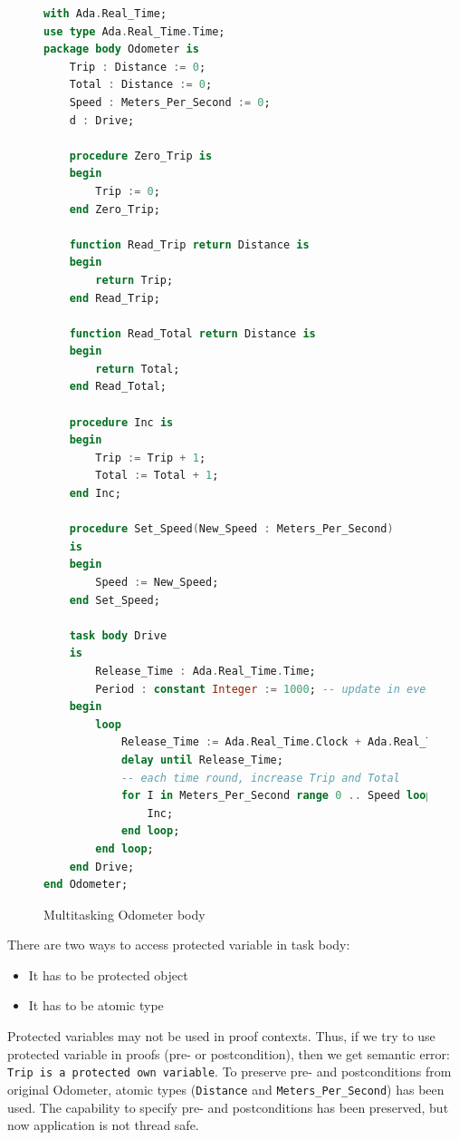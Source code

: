 \begin{figure}
\singlespacing
\begin{lstlisting}[language=ada, frame=single, gobble=0]
with Ada.Real_Time;
use type Ada.Real_Time.Time;
package body Odometer is
    Trip : Distance := 0;
    Total : Distance := 0;
    Speed : Meters_Per_Second := 0;
    d : Drive;
    
    procedure Zero_Trip is
    begin
        Trip := 0;
    end Zero_Trip;
    
    function Read_Trip return Distance is
    begin
        return Trip;
    end Read_Trip;
    
    function Read_Total return Distance is
    begin
        return Total;
    end Read_Total;
    
    procedure Inc is
    begin
        Trip := Trip + 1;
        Total := Total + 1;
    end Inc;
    
    procedure Set_Speed(New_Speed : Meters_Per_Second)
    is
    begin
        Speed := New_Speed;
    end Set_Speed;    
    
    task body Drive
    is
        Release_Time : Ada.Real_Time.Time;
        Period : constant Integer := 1000; -- update in every second
    begin
        loop
            Release_Time := Ada.Real_Time.Clock + Ada.Real_Time.Milliseconds(Period);
            delay until Release_Time;
            -- each time round, increase Trip and Total
            for I in Meters_Per_Second range 0 .. Speed loop
                Inc;
            end loop;            
        end loop;
    end Drive;
end Odometer;
\end{lstlisting} 
\doublespacing
\caption{Multitasking Odometer body}
\label{listing:Odometer2005Tasking_body}
\end{figure}

There are two ways to access protected variable in task body:
\begin{itemize}
    \item It has to be protected object
    \item It has to be atomic type
\end{itemize}

Protected variables may not be used in proof contexts. Thus, if we try to use protected variable in proofs (pre- or postcondition), then we get semantic error: \lstinline{Trip is a protected own variable}. To preserve pre- and postconditions from original Odometer, atomic types (\lstinline{Distance} and \lstinline{Meters_Per_Second}) has been used. The capability to specify pre- and postconditions has been preserved, but now application is not thread safe.



